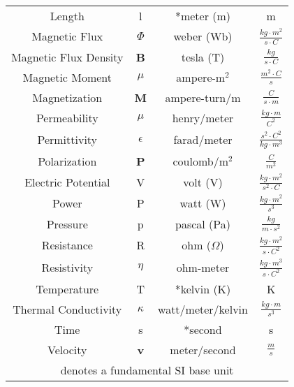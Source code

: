 \begin{table}[h]
\begin{longtable}{c c c c}
    Length          & l             & *meter (m)  & m \\[3pt]
    
    Magnetic Flux   & $\Phi$        & weber (Wb)  & $\frac{kg\cdot m^2}{s\cdot C}$ \\[3pt]
    
    Magnetic Flux Density & \textbf{B} & tesla (T) & $\frac{kg}{s\cdot C}$ \\[3pt]
    
    Magnetic Moment & $\mu$                & ampere-m$^2$ & $\frac{m^2\cdot C}{s}$ \\[3pt]
    
    Magnetization &\textbf{M}          & ampere-turn/m  & $\frac{C}{s \cdot m}$ \\[3pt]
    
    Permeability   & $\mu$                 & henry/meter     & $\frac{kg\cdot m}{C^2}$ \\[3pt]
    
    Permittivity   & $\epsilon$            & farad/meter    & $\frac{s^2\cdot C^2}{kg\cdot m^3}$ \\[3pt]
    
    Polarization   & \textbf{P}    & coulomb/m$^2$       & $\frac{C}{m^2}$ \\[3pt]
    
    Electric Potential & V    & volt (V)   & $\frac{kg\cdot m^2}{s^2\cdot C}$ \\[3pt]
    
    Power              & P         & watt (W)   & $\frac{kg\cdot m^2}{s^3}$ \\[3pt]

    Pressure           & p         & pascal (Pa) & $\frac{kg}{m\cdot s^2}$ \\[3pt]

    Resistance         & R         & ohm ($\Omega$) & $\frac{kg\cdot m^2}{s\cdot C^2}$ \\[3pt]

    Resistivity        & $\eta$    & ohm-meter            &  $\frac{kg\cdot m^3}{s\cdot C^2}$ \\[3pt]

    Temperature        & T         & *kelvin (K)           & K \\[3pt]  

    Thermal Conductivity & $\kappa$ & watt/meter/kelvin & $\frac{kg\cdot m}{s^3}$ \\[3pt]

    Time & s & *second & s \\[3pt]

    Velocity \B& \textbf{v} & meter/second & $\frac{m}{s}$ \\[3pt]
    \hline
    \multicolumn{4}{c}{\T* denotes a fundamental SI base unit}
  \end{longtable}
  \label{Table:units}
\end{table}
\vfill

